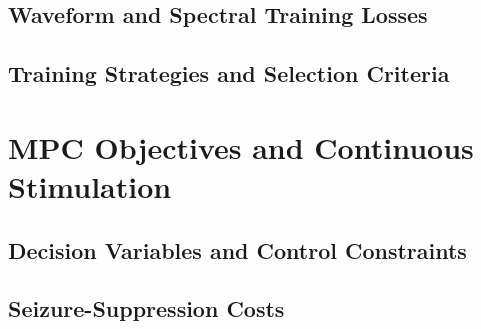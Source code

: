 \subsection{Waveform and Spectral Training Losses}

\subsection{Training Strategies and Selection Criteria}

\section{MPC Objectives and Continuous Stimulation}

\subsection{Decision Variables and Control Constraints}

\subsection{Seizure-Suppression Costs}

